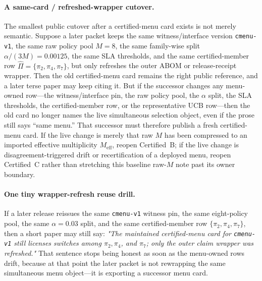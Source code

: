 \documentclass[11pt]{article}
\begin{document}
\paragraph{A same-card / refreshed-wrapper cutover.}
The smallest public cutover after a certified-menu card exists is not merely semantic.
Suppose a later packet keeps the same witness/interface version \texttt{cmenu-v1}, the same raw policy pool $M=8$, the same family-wise split $\alpha/(3M)=0.00125$, the same SLA thresholds, and the same certified-member row $\widehat\Pi=\{\pi_2,\pi_4,\pi_7\}$, but only refreshes the outer ABOM or release-receipt wrapper.
Then the old certified-menu card remains the right public reference, and a later terse paper may keep citing it.
But if the successor changes any menu-owned row---the witness/interface pin, the raw policy pool, the $\alpha$ split, the SLA thresholds, the certified-member row, or the representative UCB row---then the old card no longer names the live simultaneous selection object, even if the prose still says ``same menu.''
That successor must therefore publish a fresh certified-menu card.
If the live change is merely that raw $M$ has been compressed to an imported effective multiplicity $M_{\mathrm{eff}}$, reopen Certified~B; if the live change is disagreement-triggered drift or recertification of a deployed menu, reopen Certified~C rather than stretching this baseline raw-$M$ note past its owner boundary.\cite{series:sigcomp,series:recert}

\paragraph{One tiny wrapper-refresh reuse drill.}
If a later release reissues the same \texttt{cmenu-v1} witness pin, the same eight-policy pool, the same $\alpha=0.03$ split, and the same certified-member row $\{\pi_2,\pi_4,\pi_7\}$, then a short paper may still say: \emph{"The maintained certified-menu card for \texttt{cmenu-v1} still licenses switches among $\pi_2,\pi_4$, and $\pi_7$; only the outer claim wrapper was refreshed."}
That sentence stops being honest as soon as the menu-owned rows drift, because at that point the later packet is not rewrapping the same simultaneous menu object---it is exporting a successor menu card.
\end{document}
